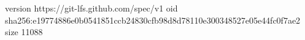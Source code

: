 version https://git-lfs.github.com/spec/v1
oid sha256:e19774886e0b0541851ccb24830cfb98d8d78110e300348527e05e44fc0f7ae2
size 11088
